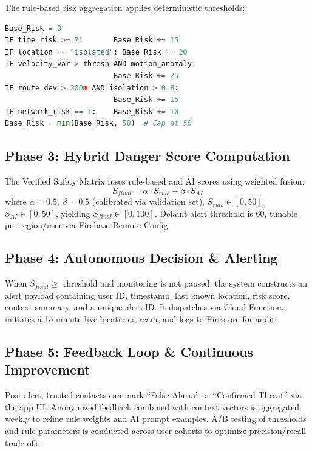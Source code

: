 The rule-based risk aggregation applies deterministic thresholds:
\begin{lstlisting}[language=Python,caption={Rule-Based Risk Aggregation}]
Base_Risk = 0
IF time_risk >= 7:       Base_Risk += 15
IF location == "isolated": Base_Risk += 20
IF velocity_var > thresh AND motion_anomaly:
                         Base_Risk += 25
IF route_dev > 200m AND isolation > 0.8:
                         Base_Risk += 15
IF network_risk == 1:    Base_Risk += 10
Base_Risk = min(Base_Risk, 50)  # Cap at 50
\end{lstlisting}

\subsection{Phase 3: Hybrid Danger Score Computation}
The Verified Safety Matrix fuses rule-based and AI scores using weighted fusion:
\begin{equation}
S_{final} = \alpha \cdot S_{rule} + \beta \cdot S_{AI}
\label{eq:fusion}
\end{equation}
where $\alpha = 0.5$, $\beta = 0.5$ (calibrated via validation set), $S_{rule} \in [0, 50]$, $S_{AI} \in [0, 50]$, yielding $S_{final} \in [0, 100]$. Default alert threshold is 60, tunable per region/user via Firebase Remote Config.

\subsection{Phase 4: Autonomous Decision \& Alerting}
When $S_{final} \geq$ threshold and monitoring is not paused, the system constructs an alert payload containing user ID, timestamp, last known location, risk score, context summary, and a unique alert ID. It dispatches via Cloud Function, initiates a 15-minute live location stream, and logs to Firestore for audit.

\subsection{Phase 5: Feedback Loop \& Continuous Improvement}
Post-alert, trusted contacts can mark ``False Alarm'' or ``Confirmed Threat'' via the app UI. Anonymized feedback combined with context vectors is aggregated weekly to refine rule weights and AI prompt examples. A/B testing of thresholds and rule parameters is conducted across user cohorts to optimize precision/recall trade-offs.

